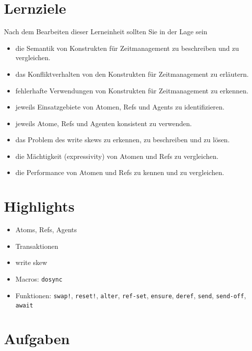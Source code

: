 \documentclass[11pt,a4paper]{article}
\theoremstyle{break}
\begin{document}
\section{Lernziele}

Nach dem Bearbeiten dieser Lerneinheit sollten Sie in der Lage sein

\begin{itemize}
    \item die Semantik von Konstrukten f\"ur Zeitmanagement zu beschreiben und zu vergleichen.
    \item das Konfliktverhalten von den Konstrukten f\"ur Zeitmanagement zu erl\"autern.
    \item fehlerhafte Verwendungen von Konstrukten f\"ur Zeitmanagement zu erkennen.
    \item jeweils Einsatzgebiete von Atomen, Refs und Agents zu identifizieren.
    \item jeweils Atome, Refs und Agenten konsistent zu verwenden.
    \item das Problem des write skews zu erkennen, zu beschreiben und zu l\"osen.
    \item die M\"achtigkeit (expressivity) von Atomen und Refs zu vergleichen.
    \item die Performance von Atomen und Refs zu kennen und zu vergleichen.
\end{itemize}

\section{Highlights}

\begin{itemize}
    \item Atoms, Refs, Agents
    \item Transaktionen
    \item write skew
    \item Macros: \verb|dosync|
    \item Funktionen: \verb|swap!|, \verb|reset!|, \verb|alter|, \verb|ref-set|, \verb|ensure|, \verb|deref|, \verb|send|, \verb|send-off|, \verb|await|
\end{itemize}



\section{Aufgaben}
\end{document}
